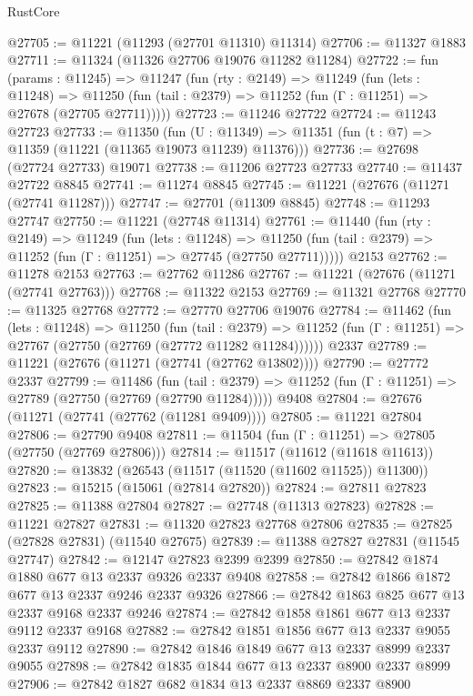 \begin{lexlean}{RustCore}
\begin{coremodule}
@27705 := @11221 (@11293 (@27701 @11310) @11314)
@27706 := @11327 @1883
@27711 := @11324 (@11326 @27706 @19076 @11282 @11284)
@27722 := fun (params : @11245) =>
  @11247
    (fun (rty : @2149) =>
    @11249
      (fun (lets : @11248) =>
      @11250 (fun (tail : @2379) => @11252 (fun (Γ : @11251) => @27678 (@27705 @27711)))))
@27723 := @11246 @27722
@27724 := @11243 @27723
@27733 := @11350
    (fun (U : @11349) => @11351 (fun (t : @7) => @11359 (@11221 (@11365 @19073 @11239) @11376)))
@27736 := @27698 (@27724 @27733) @19071
@27738 := @11206 @27723 @27733
@27740 := @11437 @27722 @8845
@27741 := @11274 @8845
@27745 := @11221 (@27676 (@11271 (@27741 @11287)))
@27747 := @27701 (@11309 @8845)
@27748 := @11293 @27747
@27750 := @11221 (@27748 @11314)
@27761 := @11440
    (fun (rty : @2149) =>
    @11249
      (fun (lets : @11248) =>
      @11250 (fun (tail : @2379) => @11252 (fun (Γ : @11251) => @27745 (@27750 @27711)))))
    @2153
@27762 := @11278 @2153
@27763 := @27762 @11286
@27767 := @11221 (@27676 (@11271 (@27741 @27763)))
@27768 := @11322 @2153
@27769 := @11321 @27768
@27770 := @11325 @27768
@27772 := @27770 @27706 @19076
@27784 := @11462
    (fun (lets : @11248) =>
    @11250
      (fun (tail : @2379) =>
      @11252 (fun (Γ : @11251) => @27767 (@27750 (@27769 (@27772 @11282 @11284))))))
    @2337
@27789 := @11221 (@27676 (@11271 (@27741 (@27762 @13802))))
@27790 := @27772 @2337
@27799 := @11486
    (fun (tail : @2379) => @11252 (fun (Γ : @11251) => @27789 (@27750 (@27769 (@27790 @11284)))))
    @9408
@27804 := @27676 (@11271 (@27741 (@27762 (@11281 @9409))))
@27805 := @11221 @27804
@27806 := @27790 @9408
@27811 := @11504 (fun (Γ : @11251) => @27805 (@27750 (@27769 @27806)))
@27814 := @11517 (@11612 (@11618 @11613))
@27820 := @13832 (@26543 (@11517 (@11520 (@11602 @11525)) @11300))
@27823 := @15215 (@15061 (@27814 @27820))
@27824 := @27811 @27823
@27825 := @11388 @27804
@27827 := @27748 (@11313 @27823)
@27828 := @11221 @27827
@27831 := @11320 @27823 @27768 @27806
@27835 := @27825 (@27828 @27831) (@11540 @27675)
@27839 := @11388 @27827 @27831 (@11545 @27747)
@27842 := @12147 @27823 @2399 @2399
@27850 := @27842 @1874 @1880 @677 @13 @2337 @9326 @2337 @9408
@27858 := @27842 @1866 @1872 @677 @13 @2337 @9246 @2337 @9326
@27866 := @27842 @1863 @825 @677 @13 @2337 @9168 @2337 @9246
@27874 := @27842 @1858 @1861 @677 @13 @2337 @9112 @2337 @9168
@27882 := @27842 @1851 @1856 @677 @13 @2337 @9055 @2337 @9112
@27890 := @27842 @1846 @1849 @677 @13 @2337 @8999 @2337 @9055
@27898 := @27842 @1835 @1844 @677 @13 @2337 @8900 @2337 @8999
@27906 := @27842 @1827 @682 @1834 @13 @2337 @8869 @2337 @8900

\end{coremodule}
\end{lexlean}
